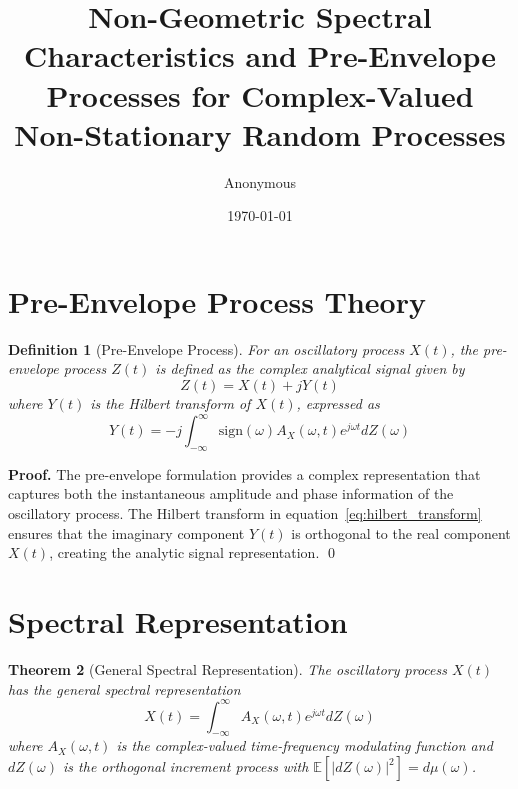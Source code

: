 \documentclass[12pt,a4paper]{article}
\title{Non-Geometric Spectral Characteristics and Pre-Envelope Processes for Complex-Valued Non-Stationary Random Processes}
\author{Anonymous}
\date{\today}
\newtheorem{theorem}{Theorem}[section]
\newtheorem{definition}[theorem]{Definition}
\renewenvironment{proof}{\noindent\textbf{Proof.}}{\qed}
\begin{document}
\maketitle

\section{Pre-Envelope Process Theory}

\begin{definition}[Pre-Envelope Process]\label{def:pre_envelope}
For an oscillatory process $X(t)$, the pre-envelope process $Z(t)$ is defined as the complex analytical signal given by
\begin{equation}\label{eq:pre_envelope_def}
Z(t) = X(t) + jY(t)
\end{equation}
where $Y(t)$ is the Hilbert transform of $X(t)$, expressed as
\begin{equation}\label{eq:hilbert_transform}
Y(t) = -j\int_{-\infty}^{\infty} \text{sign}(\omega) A_X(\omega, t) e^{j\omega t} dZ(\omega)
\end{equation}
\end{definition}

\begin{proof}
The pre-envelope formulation provides a complex representation that captures both the instantaneous amplitude and phase information of the oscillatory process. The Hilbert transform in equation~\eqref{eq:hilbert_transform} ensures that the imaginary component $Y(t)$ is orthogonal to the real component $X(t)$, creating the analytic signal representation.
\end{proof}

\section{Spectral Representation}

\begin{theorem}[General Spectral Representation]\label{thm:spectral_rep}
The oscillatory process $X(t)$ has the general spectral representation
\begin{equation}\label{eq:spectral_rep}
X(t) = \int_{-\infty}^{\infty} A_X(\omega, t) e^{j\omega t} dZ(\omega)
\end{equation}
where $A_X(\omega, t)$ is the complex-valued time-frequency modulating function and $dZ(\omega)$ is the orthogonal increment process with $\mathbb{E}[|dZ(\omega)|^2] = d\mu(\omega)$.
\end{theorem}
\end{document}

